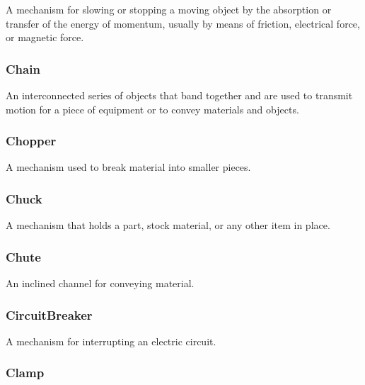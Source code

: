 A mechanism for slowing or stopping a moving object by the absorption or transfer of the energy of momentum, usually by means of friction, electrical force, or magnetic force.

\FloatBarrier

\subsubsection{Chain}
\label{sec:Chain}



An interconnected series of objects that band together and are used to transmit motion for a piece of equipment or to convey materials and objects.

\FloatBarrier

\subsubsection{Chopper}
\label{sec:Chopper}



A mechanism used to break material into smaller pieces.

\FloatBarrier

\subsubsection{Chuck}




A mechanism that holds a part, stock material, or any other item in place.

\FloatBarrier

\subsubsection{Chute}
\label{sec:Chute}



An inclined channel for conveying material.

\FloatBarrier

\subsubsection{CircuitBreaker}
\label{sec:CircuitBreaker}



A mechanism for interrupting an electric circuit.

\FloatBarrier

\subsubsection{Clamp}
\label{sec:Clamp}



